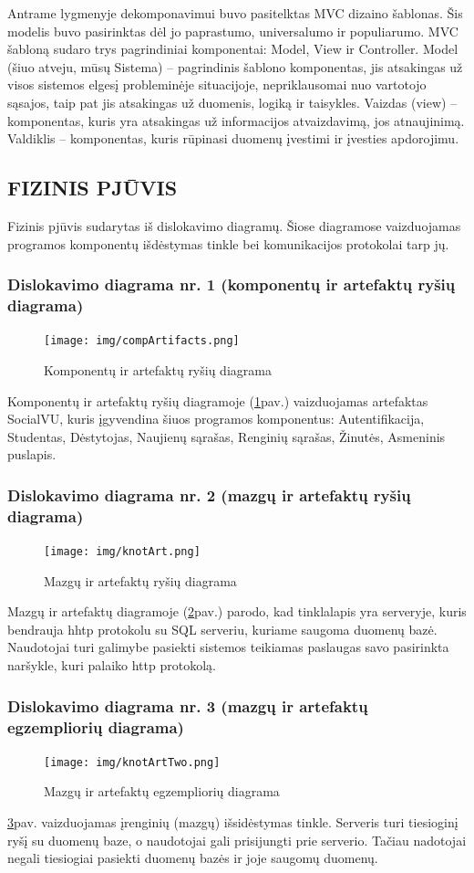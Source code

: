 \documentclass{VUMIFPSkursinis}
\begin{document}
	Antrame lygmenyje dekomponavimui buvo pasitelktas MVC dizaino šablonas. Šis modelis buvo pasirinktas dėl jo paprastumo, universalumo ir populiarumo.
	MVC šabloną sudaro trys pagrindiniai komponentai: Model, View ir Controller. Model (šiuo atveju, mūsų Sistema) – pagrindinis šablono komponentas, jis atsakingas už visos sistemos elgesį probleminėje situacijoje, nepriklausomai nuo vartotojo sąsajos, taip pat jis atsakingas už duomenis, logiką ir taisykles. Vaizdas (view) – komponentas, kuris
	yra atsakingas už informacijos atvaizdavimą, jos atnaujinimą. Valdiklis – komponentas,
	kuris rūpinasi duomenų įvestimi ir įvesties apdorojimu.
	
	\newpage
	\subsection{FIZINIS PJŪVIS}
	Fizinis pjūvis sudarytas iš dislokavimo diagramų. Šiose diagramose vaizduojamas programos komponentų išdėstymas tinkle bei komunikacijos protokolai tarp jų. 
	\subsubsection{Dislokavimo diagrama nr. 1 (komponentų ir artefaktų ryšių diagrama)}
	\begin{figure}[H]
		\centering
		\texttt{[image: img/compArtifacts.png]}
		\caption{Komponentų ir artefaktų ryšių diagrama}
		\label{fig:compOne}
	\end{figure}
	Komponentų ir artefaktų ryšių diagramoje (\ref{fig:compOne}pav.) vaizduojamas artefaktas SocialVU, kuris įgyvendina šiuos programos komponentus: Autentifikacija, Studentas, Dėstytojas, Naujienų sąrašas, Renginių sąrašas, Žinutės, Asmeninis puslapis.
	\subsubsection{Dislokavimo diagrama nr. 2 (mazgų ir artefaktų ryšių diagrama)}
	\begin{figure}[H]
		\centering
		\texttt{[image: img/knotArt.png]}
		\caption{Mazgų ir artefaktų ryšių diagrama}
		\label{fig:compTwo}
	\end{figure}
	Mazgų ir artefaktų diagramoje (\ref{fig:compTwo}pav.) parodo, kad tinklalapis yra serveryje, kuris bendrauja hhtp protokolu su SQL serveriu, kuriame saugoma duomenų bazė. Naudotojai turi galimybe pasiekti sistemos teikiamas paslaugas savo pasirinkta naršykle, kuri palaiko http protokolą.
	\subsubsection{Dislokavimo diagrama nr. 3 (mazgų ir artefaktų egzempliorių diagrama)}
	\begin{figure}[H]
		\centering
		\texttt{[image: img/knotArtTwo.png]}
		\caption{Mazgų ir artefaktų egzempliorių diagrama}
		\label{fig:compThree}
	\end{figure}
	\ref{fig:compThree}pav. vaizduojamas įrenginių (mazgų) išsidėstymas tinkle. Serveris turi tiesioginį ryšį su duomenų baze, o naudotojai gali prisijungti prie serverio. Tačiau nadotojai negali tiesiogiai pasiekti duomenų bazės ir joje saugomų duomenų.
	\newpage
\end{document}
